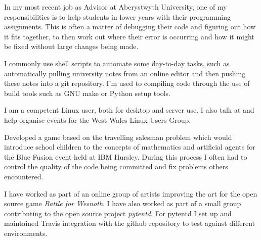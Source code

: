 \documentclass[10pt,stdletter,dateno,sigleft]{newlfm} %
\begin{document}
\begin{newlfm}
In my most recent job as Advisor at Aberystwyth University, one of my 
responsibilities is to help students in lower years with their programming 
assignments. This is often a matter of debugging their code and 
figuring out how it fits together, to then work out where their error is
occurring and how it might be fixed without large changes being made.

I commonly use shell scripts to automate some day-to-day tasks, such as 
automatically pulling university notes from an
online editor and then pushing these notes into a git repository. I'm
used to compiling code through the use of build tools such as GNU make or 
Python setup tools. 






I am a competent Linux user, both for desktop and server use. I also talk at 
and help organise events for the West Wales Linux Users Group.

Developed a game based on the travelling salesman problem which would introduce
school children to the concepts of mathematics and artificial agents for the
Blue Fusion event held at IBM Hursley. During this process I often had to 
control the quality of the code being committed and fix problems others 
encountered.

I have worked as part of an online group of artists improving the art for the
open source game \textit{Battle for Wesnoth}. I have also worked as part of a small 
group contributing to the open source project \textit{pytentd}. For pytentd I
set up and maintained Travis integration with the github repository to test against
different environments.


\end{newlfm}
\end{document}
